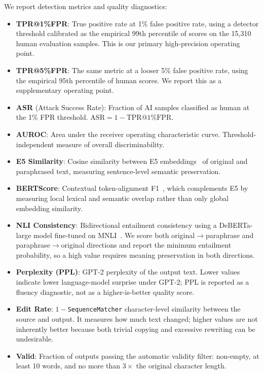 \documentclass[11pt]{article}
\begin{document}
We report detection metrics and quality diagnostics:
\begin{itemize}[leftmargin=*,itemsep=2pt]
  \item \textbf{TPR@1\%FPR}: True positive rate at 1\% false positive rate, using a detector threshold calibrated as the empirical 99th percentile of scores on the 15,310 human evaluation samples. This is our primary high-precision operating point.
  \item \textbf{TPR@5\%FPR}: The same metric at a looser 5\% false positive rate, using the empirical 95th percentile of human scores. We report this as a supplementary operating point.
  \item \textbf{ASR} (Attack Success Rate): Fraction of AI samples classified as human at the 1\% FPR threshold. $\text{ASR} = 1 - \text{TPR@1\%FPR}$.
  \item \textbf{AUROC}: Area under the receiver operating characteristic curve. Threshold-independent measure of overall discriminability.
  \item \textbf{E5 Similarity}: Cosine similarity between E5 embeddings~\cite{wang2022e5} of original and paraphrased text, measuring sentence-level semantic preservation.
  \item \textbf{BERTScore}: Contextual token-alignment F1~\cite{zhang2020bertscore}, which complements E5 by measuring local lexical and semantic overlap rather than only global embedding similarity.
  \item \textbf{NLI Consistency}: Bidirectional entailment consistency using a DeBERTa-large model fine-tuned on MNLI~\cite{he2021deberta}. We score both original$\rightarrow$paraphrase and paraphrase$\rightarrow$original directions and report the minimum entailment probability, so a high value requires meaning preservation in both directions.
  \item \textbf{Perplexity (PPL)}: GPT-2 perplexity of the output text. Lower values indicate lower language-model surprise under GPT-2; PPL is reported as a fluency diagnostic, not as a higher-is-better quality score.
  \item \textbf{Edit Rate}: $1-$\texttt{SequenceMatcher} character-level similarity between the source and output. It measures how much text changed; higher values are not inherently better because both trivial copying and excessive rewriting can be undesirable.
  \item \textbf{Valid}: Fraction of outputs passing the automatic validity filter: non-empty, at least 10 words, and no more than $3\times$ the original character length.
\end{itemize}
\end{document}
